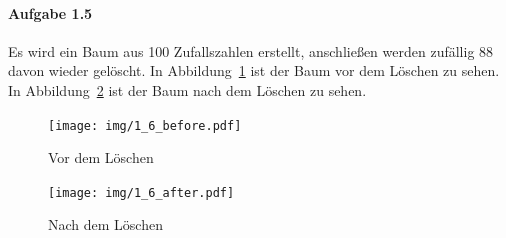 \paragraph{Aufgabe 1.5}
Es wird ein Baum aus 100 Zufallszahlen erstellt, anschließen werden zufällig 88 davon wieder
gelöscht.
In Abbildung~\ref{fig:88before} ist der Baum vor dem Löschen zu sehen.
In Abbildung~\ref{fig:88after} ist der Baum nach dem Löschen zu sehen.

\begin{figure}[hbtp]
    \centerline{\texttt{[image: img/1\_6\_before.pdf]}}
    \caption{Vor dem Löschen}
    \label{fig:88before}
\end{figure}
\begin{figure}[hbtp]
    \centering
    \texttt{[image: img/1\_6\_after.pdf]}
    \caption{Nach dem Löschen}
    \label{fig:88after}
\end{figure}
\FloatBarrier

